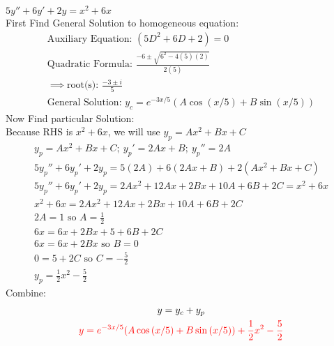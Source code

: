 \item [21.] $5y''+6y'+2y=x^2+6x$\\[2mm]
First Find General Solution to homogeneous equation:
\begin{gather*}
    \text{Auxiliary Equation: } (5D^2+6D+2)=0\\
    \text{Quadratic Formula: }\frac{-6\pm\sqrt{6^2-4(5)(2)}}{2(5)}\\
    \implies \text{root(s): } \frac{-3\pm i}{5}\\
    \text{General Solution: } y_c=e^{-3x/5}(A\cos{(x/5)}+B\sin{(x/5)})
\end{gather*}
Now Find particular Solution:\\
Because RHS is $x^2+6x$, we will use $y_p=Ax^2+Bx+C$
\begin{gather*}
    y_p=Ax^2+Bx+C;\:y_p'=2Ax+B;\:y_p''=2A\\
    5y_p''+6y_p'+2y_p=5(2A)+6(2Ax+B)+2(Ax^2+Bx+C)\\
    5y_p''+6y_p'+2y_p=2Ax^2+12Ax+2Bx+10A+6B+2C=x^2+6x\\
    x^2+6x=2Ax^2+12Ax+2Bx+10A+6B+2C\\
    2A = 1 \text{ so } A = \frac{1}{2}\\
    6x=6x+2Bx+5+6B+2C\\
    6x=6x+2Bx \text{ so } B = 0\\
    0=5+2C \text { so } C = -\frac{5}{2}\\
    y_p = \frac{1}{2}x^2-\frac{5}{2}
\end{gather*}
Combine:
\begin{gather*}
    y=y_c+y_p\\
    \textcolor{red}{y =e^{-3x/5}(A\cos{(x/5)}+B\sin{(x/5)})+\frac{1}{2}x^2-\frac{5}{2}}
\end{gather*}